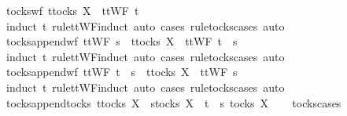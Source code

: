 \begin{isabellebody}
\isanewline
{}\isamarkupfalse%
\ tocks{\isacharunderscore}wf{\isacharcolon}\ {\isachardoublequoteopen}t{\isasymin}tocks\ X\ {\isasymLongrightarrow}\ ttWF\ t{\isachardoublequoteclose}\isanewline
%
\isadelimproof
\ \ %
\endisadelimproof
%
\isatagproof
{}\isamarkupfalse%
\ {\isacharparenleft}induct\ t\ rule{\isacharcolon}ttWF{\isachardot}induct{\isacharcomma}\ auto{\isacharcomma}\ {\isacharparenleft}cases\ rule{\isacharcolon}tocks{\isachardot}cases{\isacharcomma}\ auto{\isacharparenright}{\isacharplus}{\isacharparenright}%
\endisatagproof
{\isafoldproof}%
%
\isadelimproof
\isanewline
%
\endisadelimproof
\isanewline
{}\isamarkupfalse%
\ tocks{\isacharunderscore}append{\isacharunderscore}wf{\isacharcolon}\ {\isachardoublequoteopen}ttWF\ s\ {\isasymLongrightarrow}\ t{\isasymin}tocks\ X\ {\isasymLongrightarrow}\ ttWF\ {\isacharparenleft}t\ {\isacharat}\ s{\isacharparenright}{\isachardoublequoteclose}\isanewline
%
\isadelimproof
\ \ %
\endisadelimproof
%
\isatagproof
{}\isamarkupfalse%
\ {\isacharparenleft}induct\ t\ rule{\isacharcolon}ttWF{\isachardot}induct{\isacharcomma}\ auto{\isacharcomma}\ {\isacharparenleft}cases\ rule{\isacharcolon}tocks{\isachardot}cases{\isacharcomma}\ auto{\isacharparenright}{\isacharplus}{\isacharparenright}%
\endisatagproof
{\isafoldproof}%
%
\isadelimproof
\isanewline
%
\endisadelimproof
\isanewline
{}\isamarkupfalse%
\ tocks{\isacharunderscore}append{\isacharunderscore}wf{}{\isacharcolon}\ {\isachardoublequoteopen}ttWF\ {\isacharparenleft}t\ {\isacharat}\ s{\isacharparenright}\ {\isasymLongrightarrow}\ t{\isasymin}tocks\ X\ {\isasymLongrightarrow}\ ttWF\ s{\isachardoublequoteclose}\isanewline
%
\isadelimproof
\ \ %
\endisadelimproof
%
\isatagproof
{}\isamarkupfalse%
\ {\isacharparenleft}induct\ t\ rule{\isacharcolon}ttWF{\isachardot}induct{\isacharcomma}\ auto{\isacharcomma}\ {\isacharparenleft}cases\ rule{\isacharcolon}tocks{\isachardot}cases{\isacharcomma}\ auto{\isacharparenright}{\isacharplus}{\isacharparenright}%
\endisatagproof
{\isafoldproof}%
%
\isadelimproof
\isanewline
%
\endisadelimproof
\isanewline
{}\isamarkupfalse%
\ tocks{\isacharunderscore}append{\isacharunderscore}tocks{\isacharcolon}\ {\isachardoublequoteopen}t{\isasymin}tocks\ X\ {\isasymLongrightarrow}\ s{\isasymin}tocks\ X\ {\isasymLongrightarrow}\ t\ {\isacharat}\ s\ {\isasymin}tocks\ X{\isachardoublequoteclose}\isanewline
%
\isadelimproof
\ \ %
\endisadelimproof
%
\isatagproof
{}\isamarkupfalse%
\ tocks{\isachardot}cases\ \isamarkupfalse%

\end{isabellebody}
